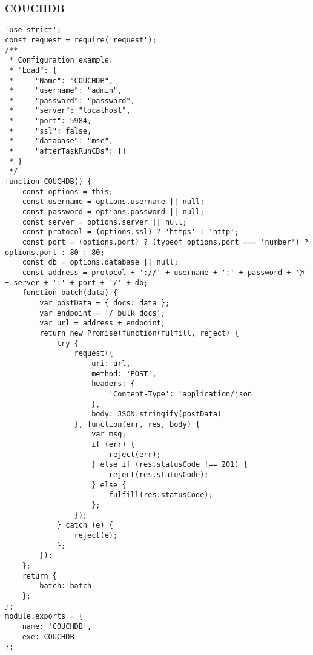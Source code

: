 \subsubsection{COUCHDB}
\label{netl-load-couchdb}
\begin{verbatim}
'use strict';
const request = require('request');
/**
 * Configuration example:
 * "Load": {
 *     "Name": "COUCHDB",
 *     "username": "admin",
 *     "password": "password",
 *     "server": "localhost",
 *     "port": 5984,
 *     "ssl": false,
 *     "database": "msc",
 *     "afterTaskRunCBs": []
 * }
 */
function COUCHDB() {
    const options = this;
    const username = options.username || null;
    const password = options.password || null;
    const server = options.server || null;
    const protocol = (options.ssl) ? 'https' : 'http';
    const port = (options.port) ? (typeof options.port === 'number') ? options.port : 80 : 80;
    const db = options.database || null;
    const address = protocol + '://' + username + ':' + password + '@' + server + ':' + port + '/' + db;
    function batch(data) {
        var postData = { docs: data };
        var endpoint = '/_bulk_docs';
        var url = address + endpoint;
        return new Promise(function(fulfill, reject) {
            try {
                request({
                    uri: url,
                    method: 'POST',
                    headers: {
                        'Content-Type': 'application/json'
                    },
                    body: JSON.stringify(postData)
                }, function(err, res, body) {
                    var msg;
                    if (err) {
                        reject(err);
                    } else if (res.statusCode !== 201) {
                        reject(res.statusCode);
                    } else {
                        fulfill(res.statusCode);
                    };
                });
            } catch (e) {
                reject(e);
            };
        });
    };
    return {
        batch: batch
    };
};
module.exports = {
    name: 'COUCHDB',
    exe: COUCHDB
};
\end{verbatim}


